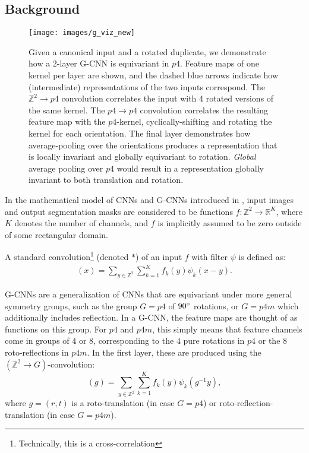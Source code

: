 \documentclass{llncs}
\begin{document}
\subsection{Background}
\begin{figure}[t]
\centerline{\texttt{[image: images/g\_viz\_new]}}
\caption{Given a canonical input and a rotated duplicate, we demonstrate how a 2-layer G-CNN is equivariant in $p4$. Feature maps of one kernel per layer are shown, and the dashed blue arrows indicate how (intermediate) representations of the two inputs correspond. The $\mathbb{Z}^2\rightarrow p4$ convolution correlates the input with 4 rotated versions of the same kernel. The $p4\rightarrow p4$ convolution correlates the resulting feature map with the $p4$-kernel, cyclically-shifting and rotating the kernel for each orientation. The final layer demonstrates how average-pooling over the orientations produces a representation that is locally invariant and globally equivariant to rotation. \textit{Global} average pooling over $p4$ would result in a representation globally invariant to both translation and rotation. }\label{fig:patho_equiv}

\end{figure}
In the mathematical model of CNNs and G-CNNs introduced in \cite{Cohen2016-do}, input images and output segmentation masks are considered to be functions $f : \mathbb{Z}^2 \rightarrow \mathbb{R}^K$, where $K$ denotes the number of channels, and $f$ is implicitly assumed to be zero outside of some rectangular domain.

A standard convolution\footnote{Technically, this is a cross-correlation} (denoted $*$) of an input $f$ with filter $\psi$ is defined as:
\begin{align}
    [f * \psi](x) = \sum_{y \in \mathbb{Z}^2}\sum^K_{k=1} f_k(y)\psi_k(x-y).
\end{align}



G-CNNs are a generalization of CNNs that are equivariant under more general symmetry groups, such as the group $G=p4$ of $90\degree$ rotations, or $G=p4m$ which additionally includes reflection.
In a G-CNN, the feature maps are thought of as functions on this group.
For $p4$ and $p4m$, this simply means that feature channels come in groups of $4$ or $8$, corresponding to the $4$ pure rotations in $p4$ or the $8$ roto-reflections in $p4m$.
In the first layer, these are produced using the $(\mathbb{Z}^2 \rightarrow G)$-convolution:
\begin{equation}
    [f * \psi](g) = \sum_{y \in \mathbb{Z}^2} \sum_{k=1}^K f_k(y) \psi_k(g^{-1} y),
\end{equation}
where $g = (r, t)$ is a roto-translation (in case $G=p4$) or roto-reflection-translation (in case $G=p4m$).
\end{document}
